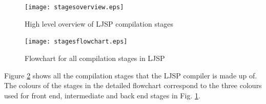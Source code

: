 \documentclass[11pt]{report}
\begin{document}
\begin{figure}[ht]
\begin{center}
\texttt{[image: stagesoverview.eps]}
\end{center}
\caption{High level overview of LJSP compilation stages}
\label{highlevelstages}
\end{figure}

\begin{figure}[ht]
\begin{center}
\texttt{[image: stagesflowchart.eps]}
\end{center}
\caption{Flowchart for all compilation stages in LJSP}
\label{stagesflowchart}
\end{figure}

Figure \ref{stagesflowchart} shows all the compilation stages that the LJSP compiler is made up of. The colours of the stages in the detailed flowchart correspond to the three colours used for front end, intermediate and back end stages in Fig. \ref{highlevelstages}. 
\end{document}
